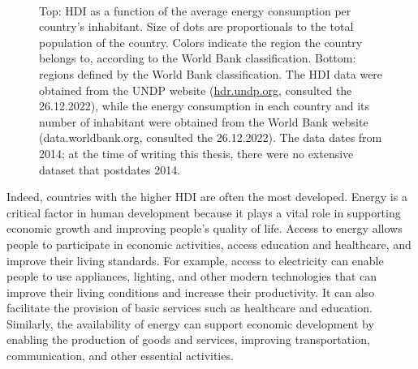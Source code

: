 \documentclass[my_thesis.tex]{subfiles}
\begin{document}
\begin{figure}
    \centering
    \\
    \centering
    \caption{Top: HDI as a function of the average energy consumption per country's inhabitant. Size of dots are proportionals to the total population of the country. Colors indicate the region the country belongs to, according to the World Bank classification. Bottom: regions defined by the World Bank classification. The HDI data were obtained from the UNDP website (\url{hdr.undp.org}, consulted the 26.12.2022), while the energy consumption in each country and its number of inhabitant were obtained from the World Bank website (data.worldbank.org, consulted the 26.12.2022). The data dates from 2014; at the time of writing this thesis, there were no extensive dataset that postdates 2014.}
    \label{fig.hdi}
\end{figure}

Indeed, countries with the higher HDI are often the most developed. Energy is a critical factor in human development because it plays a vital role in supporting economic growth and improving people's quality of life. Access to energy allows people to participate in economic activities, access education and healthcare, and improve their living standards. For example, access to electricity can enable people to use appliances, lighting, and other modern technologies that can improve their living conditions and increase their productivity. It can also facilitate the provision of basic services such as healthcare and education. Similarly, the availability of energy can support economic development by enabling the production of goods and services, improving transportation, communication, and other essential activities.
\end{document}

